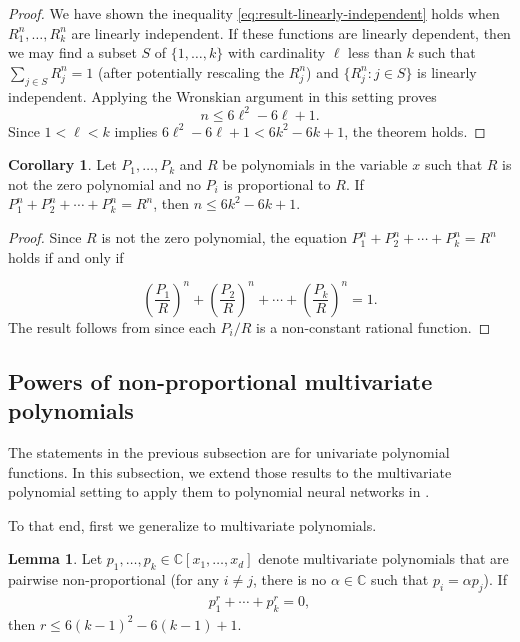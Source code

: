 \documentclass[12pt]{article}
\theoremstyle{definition}
\newtheorem{lemma}[theorem]{Lemma}
\newtheorem{corollary}[theorem]{Corollary}
\newcommand{\upperboundn}[1]{6{#1}^2-6#1+1}
\newcommand{\nNS}{n}
\newcommand{\kNS}{k}
\begin{document}
\begin{proof}
We have shown the inequality \eqref{eq:result-linearly-independent}
holds when $R_1^n,\dots,R_\kNS^n$ are linearly independent. If these functions are linearly dependent, then we may find a subset $S$ of $\{1,\dots,\kNS\}$ with cardinality $\ell$ less than $\kNS$ such that 
$\sum_{j\in S} R_j^n=1$ {(after potentially rescaling the $R_j^n$)}
and $\{R_j^n : j\in S\}$ is linearly independent.
Applying the  Wronskian argument in this setting proves
\[
    n\le \upperboundn{\ell}. 
\]
Since $1<\ell<\kNS$ implies
 $\upperboundn{\ell}< \upperboundn{\kNS}$, the theorem holds.
\end{proof}


\begin{corollary}\label{cor:NS-polynomials}
Let $P_1,\dots,P_\kNS$ and $R$ be polynomials in the variable $x$ such that $R$ is not the zero polynomial and no $P_i$ is proportional to $R$.  
If $P_1^\nNS + P_2^\nNS + \cdots + P_\kNS^\nNS = R^\nNS$, then 
$n\le \upperboundn{\kNS}$.

\end{corollary}
\begin{proof}
Since $R$ is not the zero polynomial, 
the equation $P_1^\nNS + P_2^\nNS + \cdots + P_\kNS^\nNS = R^\nNS$
holds if and only if 

    \[\left(\frac{P_1}{R}\right)^\nNS + \left(\frac{P_2}{R}\right)^\nNS+ \cdots +
    \left(\frac{P_\kNS}{R}\right)^\nNS
    =1.\]
The result follows from   since each $P_i/R$ is a non-constant rational function. 
\end{proof}

\subsection{Powers of non-proportional {multivariate} polynomials}\label{ss:hidden-layer-high-degree}


The statements in the previous subsection are for univariate polynomial functions. In this subsection, we extend those results to the multivariate polynomial setting to apply them to polynomial neural networks in . 

To that end, first we generalize  
to multivariate polynomials.

\begin{lemma}\label{lemma:ns-generalization}
Let $p_1,\dotsc,p_k\in\mathbb{C}[x_1,\dotsc,x_d]$ denote multivariate polynomials that are pairwise non-proportional (for any $i\not=j$, there is no $\alpha\in \mathbb{C}$ such that $p_i=\alpha p_j$). 
If
\begin{align*}
p_1^r + \dotsb + p_k^r = 0,
\end{align*}
then 
$r\le \upperboundn{(\kNS-1)}$.
\end{lemma}
\end{document}
